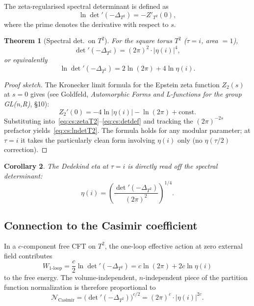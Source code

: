 \documentclass[12pt,a4paper]{article}
\newtheorem{theorem}{Theorem}[section]
\newtheorem{corollary}[theorem]{Corollary}
\theoremstyle{definition}
\theoremstyle{remark}
\begin{document}
The zeta-regularised spectral determinant is defined as
\begin{equation}
  \ln\det'(-\Delta_{T^2}) = -Z'_{T^2}(0),
  \label{eq:cs:detdef}
\end{equation}
where the prime denotes the derivative with respect to $s$.

\begin{theorem}[Spectral det.\ on $T^2$]\label{thm:cs:spectraldet}
  For the square torus $T^2$ ($\tau = i$, area $= 1$),
  \begin{equation}
    \det'(-\Delta_{T^2}) = (2\pi)^2 \cdot |\eta(i)|^4,
    \label{eq:cs:detT2}
  \end{equation}
  or equivalently
  \begin{equation}
    \ln\det'(-\Delta_{T^2})
    = 2\ln(2\pi) + 4\ln\eta(i).
    \label{eq:cs:lndetT2}
  \end{equation}
\end{theorem}

\begin{proof}[Proof sketch]
  The Kronecker limit formula for the Epstein zeta function $Z_2(s)$ at
  $s=0$ gives (see Goldfeld, \textit{Automorphic Forms and L-functions for
  the group GL(n,R)}, §10):
  \[
    Z_2'(0) = -4\ln|\eta(i)| - \ln(2\pi) + \text{const.}
  \]
  Substituting into~\eqref{eq:cs:zetaT2}--\eqref{eq:cs:detdef} and tracking
  the $(2\pi)^{-2s}$ prefactor yields~\eqref{eq:cs:lndetT2}.  The formula
  holds for any modular parameter; at $\tau = i$ it takes the particularly
  clean form involving $\eta(i)$ only (no $\eta(\tau/2)$ correction).
\end{proof}

\begin{corollary}\label{cor:cs:etafromlndet}
  The Dedekind eta at $\tau = i$ is directly read off the spectral determinant:
  \begin{equation}
    \eta(i) = \left(\frac{\det'(-\Delta_{T^2})}{(2\pi)^2}\right)^{1/4}.
    \label{eq:cs:etafromlndet}
  \end{equation}
\end{corollary}

\subsection{Connection to the Casimir coefficient}

In a $c$-component free CFT on $T^2$, the one-loop effective action at
zero external field contributes
\begin{equation}
  W_{\mathrm{1\text{-}loop}} = \frac{c}{2}\ln\det'(-\Delta_{T^2})
  = c\ln(2\pi) + 2c\ln\eta(i)
  \label{eq:cs:Woneloop}
\end{equation}
to the free energy.  The volume-independent, $n$-independent piece of the
partition function normalization is therefore proportional to
\begin{equation}
  \mathcal{N}_{\mathrm{Casimir}}
  = \bigl(\det'(-\Delta_{T^2})\bigr)^{c/2}
  = (2\pi)^c \cdot |\eta(i)|^{2c}.
  \label{eq:cs:Ncasimir}
\end{equation}
\end{document}
